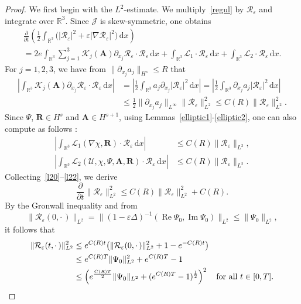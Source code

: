 \documentclass[10pt]{amsart}
\theoremstyle{definition}\newtheorem{defi}[theo]{Definition}\newtheorem{rema}[theo]{Remark}\newtheorem{exam}[theo]{Example}\newtheorem{exem}[theo]{Example}\newtheorem{nota}[theo]{Notation}
\newcommand{\BA}{\mathbf{A}}
\newcommand{\BR}{\mathbf{R}}
\newcommand{\R}{\mathbb{R}}
\DeclareMathOperator{\IM}{Im}
\DeclareMathOperator{\RE}{Re}
\newcommand*{\dd}{\mathrm{d}}
\newcommand*{\dx}{\dd x}
\begin{document}
\begin{proof}
We first begin with the $L^2$-estimate. We multiply~\eqref{regul} by $\mathcal{R}_\varepsilon$ and integrate over $\R^3$. Since $\mathcal{J}$ is skew-symmetric, one obtains
\begin{multline}\label{l20}
\frac{\partial}{\partial t} \left(\frac{1}{2} \int_{\R^3}
\big(| \mathcal{R}_\varepsilon|^2+\varepsilon|\nabla \mathcal{R}_\varepsilon|^2 \big)\,\dx \right)
\\
= 2e \int_{\R^3} \sum_{j=1}^3 \mathcal{K}_j(\BA) \partial_{x_j}
\mathcal{R}_\varepsilon \cdot \mathcal{R}_\varepsilon \,\dx +\int_{\R^3} \mathcal{L}_1 \cdot \mathcal{R}_\varepsilon \,\dx +\int_{\R^3} \mathcal{L}_2 \cdot \mathcal{R}_\varepsilon \,\dx.
\end{multline}
For $j=1,2,3$, we have from $\| \partial_{x_j} a_j \|_{H^s} \le R$ that
\begin{align}\label{l21}
\left| \int_{\R^3} \mathcal{K}_j(\BA) \partial_{x_j}
\mathcal{R}_\varepsilon \cdot \mathcal{R}_\varepsilon \,\dx \right| &=\left| \frac{1}{2}\int_{\R^3} a_j \partial_{x_j} |\mathcal{R}_\varepsilon |^2 \,\dx \right| =\left| \frac{1}{2}\int_{\R^3} \partial_{x_j}a_j |\mathcal{R}_\varepsilon |^2 \,\dx \right|
\nonumber \\
&\leq \frac{1}{2} \| \partial_{x_j}a_j \|_{L^\infty} \| \mathcal{R}_\varepsilon \|_{L^2}^2
\le C(R) \| \mathcal{R}_\varepsilon \|_{L^2}^2.
\end{align}
Since $\Psi$, $\BR \in H^s$ and $\BA \in H^{s+1}$, using Lemmas~\ref{elliptic1}-\ref{elliptic2}, one can also compute as follows :
\begin{align}\label{l22}
\left| \int_{\R^3} \mathcal{L}_1 (\nabla\chi, \BR) \cdot \mathcal{R}_\varepsilon \,\dx \right| & \leq C(R) \| \mathcal{R}_\varepsilon \|_{L^2}, \nonumber \\
\left| \int_{\R^3} \mathcal{L}_2 (\mathcal{U},\chi,\Psi,\BA, \BR)
\cdot \mathcal{R}_\varepsilon \,\dx \right| &\leq C(R) \| \mathcal{R}_\varepsilon \|_{L^2}.
\end{align}
Collecting~\eqref{l20}--\eqref{l22}, we derive
\[
\frac{\partial}{\partial t} \| \mathcal{R}_\varepsilon \|_{L^2}^2
\leq C(R) \| \mathcal{R}_\varepsilon \|_{L^2}^2 +C(R).
\]
By the Gronwall inequality and from
\[
\| \mathcal{R}_{\varepsilon}(0,{\cdot\,}) \|_{L^2}
= \| (1-\varepsilon \Delta)^{-1} (\RE \Psi_0,\IM\Psi_0) \|_{L^2}
\le \| \Psi_0 \|_{L^2},
\]
it follows that
\begin{align*}
\| \mathcal{R}_\varepsilon (t,{\cdot\,}) \|_{L^2}^2 & \le e^{C(R)t} \big(\| \mathcal{R}_\varepsilon (0,{\cdot\,}) \|_{L^2}^2 +1-e^{-C(R)t} \big) \\
&\le e^{C(R)T} \| \Psi_0 \|_{L^2}^2 + e^{C(R)T}-1 \\
& \le \left(e^{ \frac{C(R)T}{2}} \| \Psi_0\|_{L^2} +(e^{C(R)T}-1)^{\frac{1}{2}} \right)^2 \quad
\hbox{for all} \ t\in [0,T].
\end{align*}


\end{proof}
\end{document}
